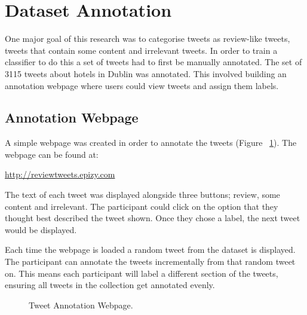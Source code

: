 \section{Dataset Annotation}

One major goal of this research was to categorise tweets as review-like tweets, tweets that contain some content and irrelevant tweets. In order to train a classifier to do this a set of tweets had to first be manually annotated. The set of 3115 tweets about hotels in Dublin was annotated. This involved building an annotation webpage where users could view tweets and assign them labels.

\subsection*{Annotation Webpage}

A simple webpage was created in order to annotate the tweets (Figure ~\ref{fig:webpage}). The webpage can be found at:
\begin{center}
    \url{http://reviewtweets.epizy.com}\newline
\end{center}
The text of each tweet was displayed alongside three buttons; review, some content and irrelevant. The participant could click on the option that they thought best described the tweet shown. Once they chose a label, the next tweet would be displayed. 

Each time the webpage is loaded a random tweet from the dataset is displayed. The participant can annotate the tweets incrementally from that random tweet on. This means each participant will label a different section of the tweets, ensuring all tweets in the collection get annotated evenly.

\begin{figure}[h!]
\centering
{}
\caption{\label{fig:webpage} Tweet Annotation Webpage.}
\end{figure}


